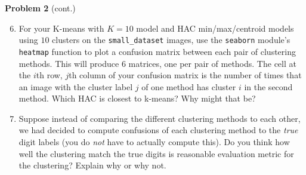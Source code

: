\documentclass[submit]{harvardml}
\begin{document}
\newpage
\begin{framed}
\noindent\textbf{Problem 2} (cont.)\\
\begin{enumerate}
\setcounter{enumi}{5}
\item For your K-means with $K = 10$ model and HAC min/max/centroid
  models using $10$ clusters on the \texttt{small\_dataset} images,
  use the \texttt{seaborn} module's \texttt{heatmap} function to plot
  a confusion matrix between each pair of clustering methods.  This
  will produce 6 matrices, one per pair of methods. The cell at the
  $i$th row, $j$th column of your confusion matrix is the number of
  times that an image with the cluster label $j$ of one method has
  cluster $i$ in the second method.  Which HAC is closest to k-means?
  Why might that be?

\item Suppose instead of comparing the different clustering methods to
  each other, we had decided to compute confusions of each clustering
  method to the \emph{true} digit labels (you do \emph{not} have to
  actually compute this).  Do you think how well the clustering match
  the true digits is reasonable evaluation metric for the clustering?
  Explain why or why not.
  
\end{enumerate}
\end{framed}
\end{document}
